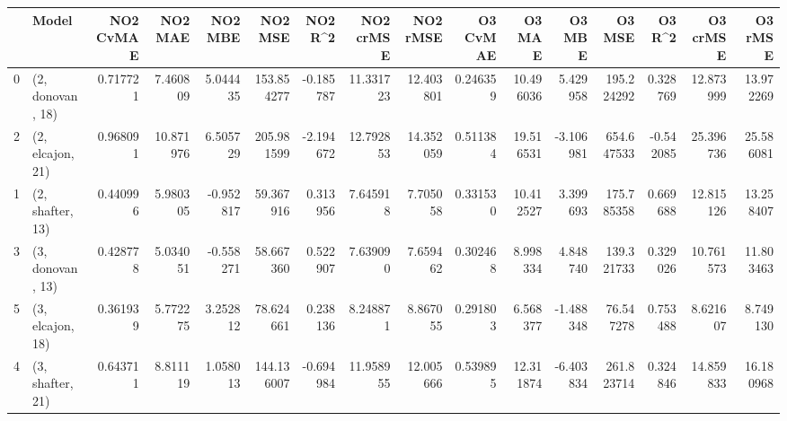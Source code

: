 \begin{tabular}{llrrrrrrrrrrrrrr}
\toprule
{} &             Model &  NO2 CvMAE &    NO2 MAE &   NO2 MBE &     NO2 MSE &   NO2 R\textasciicircum2 &  NO2 crMSE &   NO2 rMSE &  O3 CvMAE &     O3 MAE &    O3 MBE &      O3 MSE &    O3 R\textasciicircum2 &   O3 crMSE &    O3 rMSE \\
\midrule
0 &  (2, donovan, 18) &   0.717721 &   7.460809 &  5.044435 &  153.854277 & -0.185787 &  11.331723 &  12.403801 &  0.246359 &  10.496036 &  5.429958 &  195.224292 &  0.328769 &  12.873999 &  13.972269 \\
2 &  (2, elcajon, 21) &   0.968091 &  10.871976 &  6.505729 &  205.981599 & -2.194672 &  12.792853 &  14.352059 &  0.511384 &  19.516531 & -3.106981 &  654.647533 & -0.542085 &  25.396736 &  25.586081 \\
1 &  (2, shafter, 13) &   0.440996 &   5.980305 & -0.952817 &   59.367916 &  0.313956 &   7.645918 &   7.705058 &  0.331530 &  10.412527 &  3.399693 &  175.785358 &  0.669688 &  12.815126 &  13.258407 \\
3 &  (3, donovan, 13) &   0.428778 &   5.034051 & -0.558271 &   58.667360 &  0.522907 &   7.639090 &   7.659462 &  0.302468 &   8.998334 &  4.848740 &  139.321733 &  0.329026 &  10.761573 &  11.803463 \\
5 &  (3, elcajon, 18) &   0.361939 &   5.772275 &  3.252812 &   78.624661 &  0.238136 &   8.248871 &   8.867055 &  0.291803 &   6.568377 & -1.488348 &   76.547278 &  0.753488 &   8.621607 &   8.749130 \\
4 &  (3, shafter, 21) &   0.643711 &   8.811119 &  1.058013 &  144.136007 & -0.694984 &  11.958955 &  12.005666 &  0.539895 &  12.311874 & -6.403834 &  261.823714 &  0.324846 &  14.859833 &  16.180968 \\
\bottomrule
\end{tabular}
